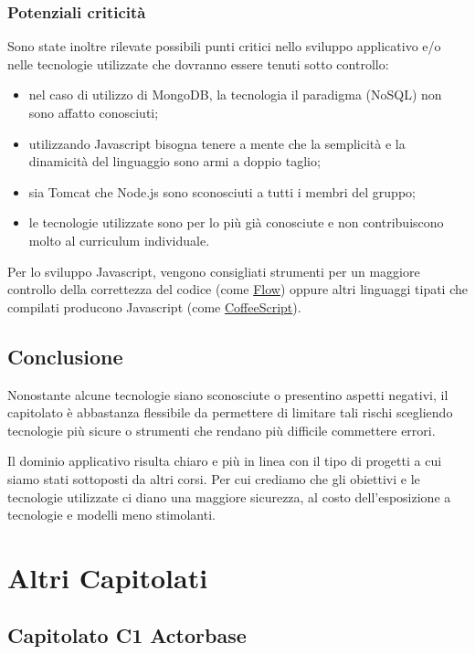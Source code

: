 \documentclass[12pt,a4paper]{article}
\begin{document}
\subsubsection{Potenziali criticità}

Sono state inoltre rilevate possibili punti critici nello sviluppo applicativo e/o nelle tecnologie utilizzate
che dovranno essere tenuti sotto controllo:

\begin{itemize}
\item nel caso di utilizzo di MongoDB, la tecnologia il paradigma (NoSQL) non sono affatto conosciuti;
\item utilizzando Javascript bisogna tenere a mente che la semplicità e la dinamicità del linguaggio
sono armi a doppio taglio;
\item sia Tomcat che Node.js sono sconosciuti a tutti i membri del gruppo;
\item le tecnologie utilizzate sono per lo più già conosciute e non contribuiscono molto
al curriculum individuale.
\end{itemize}

Per lo sviluppo Javascript, vengono consigliati strumenti per un maggiore controllo della correttezza del
codice (come \href{http://flowtype.org}{Flow}) oppure altri linguaggi tipati che compilati producono Javascript
(come \href{http://coffeescript.org}{CoffeeScript}).

\subsection{Conclusione}

Nonostante alcune tecnologie siano sconosciute o presentino aspetti negativi, il capitolato è abbastanza flessibile
da permettere di limitare tali rischi scegliendo tecnologie più sicure o strumenti che rendano più difficile commettere
errori.

Il dominio applicativo risulta chiaro e più in linea con il tipo di progetti a cui siamo stati sottoposti da altri corsi. 
Per cui crediamo che gli obiettivi e le tecnologie utilizzate
ci diano una maggiore sicurezza, al costo dell'esposizione a tecnologie e modelli meno stimolanti.

\newpage
\section{Altri Capitolati}

\subsection{Capitolato C1 Actorbase}
\end{document}
